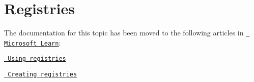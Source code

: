\chapter{Registries}
\hypertarget{md_external_2reflect-cpp_2vcpkg_2docs_2users_2registries}{}\label{md_external_2reflect-cpp_2vcpkg_2docs_2users_2registries}
\label{md_external_2reflect-cpp_2vcpkg_2docs_2users_2registries_autotoc_md760}%
%


The documentation for this topic has been moved to the following articles in \href{https://learn.microsoft.com/vcpkg}{\texttt{ Microsoft Learn}}\+:


\begin{DoxyItemize}
\item \href{https://learn.microsoft.com/vcpkg/users/registries}{\texttt{ Using registries}}
\item \href{https://learn.microsoft.com/vcpkg/maintainers/registries}{\texttt{ Creating registries}} 
\end{DoxyItemize}